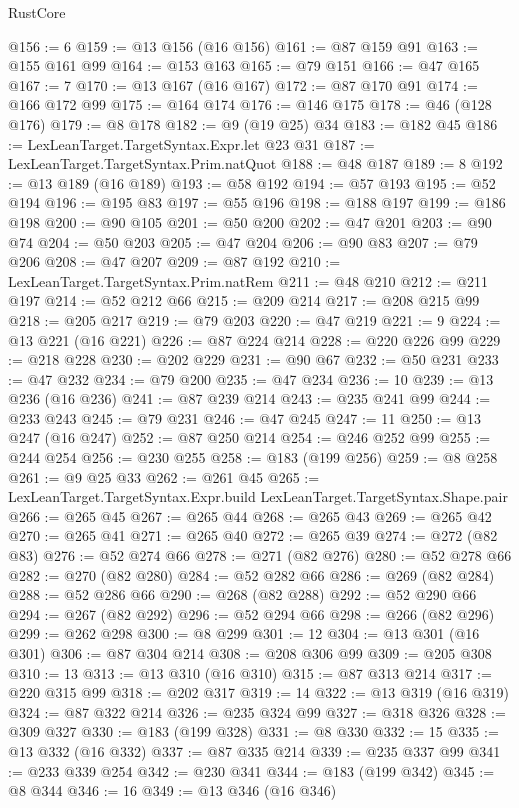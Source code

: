 \begin{lexlean}{RustCore}
\begin{coremodule}
@156 := 6
@159 := @13 @156 (@16 @156)
@161 := @87 @159 @91
@163 := @155 @161 @99
@164 := @153 @163
@165 := @79 @151
@166 := @47 @165
@167 := 7
@170 := @13 @167 (@16 @167)
@172 := @87 @170 @91
@174 := @166 @172 @99
@175 := @164 @174
@176 := @146 @175
@178 := @46 (@128 @176)
@179 := @8 @178
@182 := @9 (@19 @25) @34
@183 := @182 @45
@186 := LexLeanTarget.TargetSyntax.Expr.let @23 @31
@187 := LexLeanTarget.TargetSyntax.Prim.natQuot
@188 := @48 @187
@189 := 8
@192 := @13 @189 (@16 @189)
@193 := @58 @192
@194 := @57 @193
@195 := @52 @194
@196 := @195 @83
@197 := @55 @196
@198 := @188 @197
@199 := @186 @198
@200 := @90 @105
@201 := @50 @200
@202 := @47 @201
@203 := @90 @74
@204 := @50 @203
@205 := @47 @204
@206 := @90 @83
@207 := @79 @206
@208 := @47 @207
@209 := @87 @192
@210 := LexLeanTarget.TargetSyntax.Prim.natRem
@211 := @48 @210
@212 := @211 @197
@214 := @52 @212 @66
@215 := @209 @214
@217 := @208 @215 @99
@218 := @205 @217
@219 := @79 @203
@220 := @47 @219
@221 := 9
@224 := @13 @221 (@16 @221)
@226 := @87 @224 @214
@228 := @220 @226 @99
@229 := @218 @228
@230 := @202 @229
@231 := @90 @67
@232 := @50 @231
@233 := @47 @232
@234 := @79 @200
@235 := @47 @234
@236 := 10
@239 := @13 @236 (@16 @236)
@241 := @87 @239 @214
@243 := @235 @241 @99
@244 := @233 @243
@245 := @79 @231
@246 := @47 @245
@247 := 11
@250 := @13 @247 (@16 @247)
@252 := @87 @250 @214
@254 := @246 @252 @99
@255 := @244 @254
@256 := @230 @255
@258 := @183 (@199 @256)
@259 := @8 @258
@261 := @9 @25 @33
@262 := @261 @45
@265 := LexLeanTarget.TargetSyntax.Expr.build LexLeanTarget.TargetSyntax.Shape.pair
@266 := @265 @45
@267 := @265 @44
@268 := @265 @43
@269 := @265 @42
@270 := @265 @41
@271 := @265 @40
@272 := @265 @39
@274 := @272 (@82 @83)
@276 := @52 @274 @66
@278 := @271 (@82 @276)
@280 := @52 @278 @66
@282 := @270 (@82 @280)
@284 := @52 @282 @66
@286 := @269 (@82 @284)
@288 := @52 @286 @66
@290 := @268 (@82 @288)
@292 := @52 @290 @66
@294 := @267 (@82 @292)
@296 := @52 @294 @66
@298 := @266 (@82 @296)
@299 := @262 @298
@300 := @8 @299
@301 := 12
@304 := @13 @301 (@16 @301)
@306 := @87 @304 @214
@308 := @208 @306 @99
@309 := @205 @308
@310 := 13
@313 := @13 @310 (@16 @310)
@315 := @87 @313 @214
@317 := @220 @315 @99
@318 := @202 @317
@319 := 14
@322 := @13 @319 (@16 @319)
@324 := @87 @322 @214
@326 := @235 @324 @99
@327 := @318 @326
@328 := @309 @327
@330 := @183 (@199 @328)
@331 := @8 @330
@332 := 15
@335 := @13 @332 (@16 @332)
@337 := @87 @335 @214
@339 := @235 @337 @99
@341 := @233 @339 @254
@342 := @230 @341
@344 := @183 (@199 @342)
@345 := @8 @344
@346 := 16
@349 := @13 @346 (@16 @346)

\end{coremodule}
\end{lexlean}
